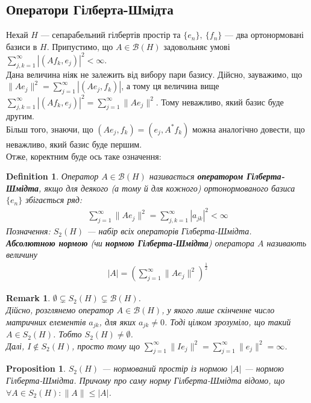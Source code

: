 \documentclass[a4paper, 10pt]{article}
\theoremstyle{theoremdd}
\theoremstyle{theoremdd}
\newtheorem{definition}[theorem]{Definition}
\theoremstyle{theoremdd}
\theoremstyle{theoremdd}
\theoremstyle{theoremdd}
\newtheorem{proposition}[theorem]{Proposition}
\theoremstyle{theoremdd}
\newtheorem{remark}[theorem]{Remark}
\theoremstyle{theoremdd}
\theoremstyle{theoremdd}
\begin{document}
\subsection{Оператори Гілберта-Шмідта}
Нехай $H$ --- сепарабельний гілбертів простір та $\{e_n\},\ \{f_n\}$ --- два ортонормовані базиси в $H$. Припустимо, що $A \in \mathcal{B}(H)$ задовольняє умові $\displaystyle\sum_{j,k=1}^\infty |(Af_k,e_j)|^2 < \infty$.\\
Дана величина ніяк не залежить від вибору пари базису. Дійсно, зауважимо, що $\|Ae_j\|^2 = \displaystyle\sum_{j=1}^\infty |(Ae_j,f_k)|$, а тому ця величина вище $\displaystyle\sum_{j,k=1}^\infty |(Af_k,e_j)|^2 = \sum_{j=1}^\infty \|Ae_j\|^2$. Тому неважливо, який базис буде другим.\\
Більш того, знаючи, що $(Ae_j,f_k) = (e_j,A^*f_k)$ можна аналогічно довести, що неважливо, який базис буде першим.\\
Отже, коректним буде ось таке означення:

\begin{definition}
Оператор $A \in \mathcal{B}(H)$ називається \textbf{оператором Гілберта-Шмідта}, якщо для деякого (а тому й для кожного) ортонормованого базиса $\{e_n\}$ збігається ряд:
\begin{align*}
\displaystyle\sum_{j=1}^\infty \|Ae_j\|^2 = \sum_{j,k=1}^\infty |a_{jk}|^2 < \infty
\end{align*}
Позначення: $S_2(H)$ --- набір всіх операторів Гілберта-Шмідта.\\
\textbf{Абсолютною нормою} (чи \textbf{нормою Гілберта-Шмідта}) оператора $A$ називають величину
\begin{align*}
|A| = \left(\sum_{j=1}^\infty \|Ae_j\|^2 \right)^{\frac{1}{2}}
\end{align*}
\end{definition}

\begin{remark}
$\emptyset \subsetneq S_2(H) \subsetneq \mathcal{B}(H)$.\\
Дійсно, розглянемо оператор $A \in \mathcal{B}(H)$, у якого лише скінченне число матричних елементів $a_{jk}$, для яких $a_{jk} \neq 0$. Тоді цілком зрозуміло, що такий $A \in S_2(H)$. Тобто $S_2(H) \neq \emptyset$.\\
Далі, $I \notin S_2(H)$, просто тому що $\displaystyle\sum_{j=1}^\infty \|Ie_j\|^2 = \sum_{j=1}^\infty \|e_j\|^2 = \infty$.
\end{remark}

\begin{proposition}
$S_2(H)$ --- нормований простір із нормою $|A|$ --- нормою Гілберта-Шмідта. Причому про саму норму Гілберта-Шмідта відомо, що $\forall A \in S_2(H): \|A\| \leq |A|$.
\end{proposition}
\end{document}
